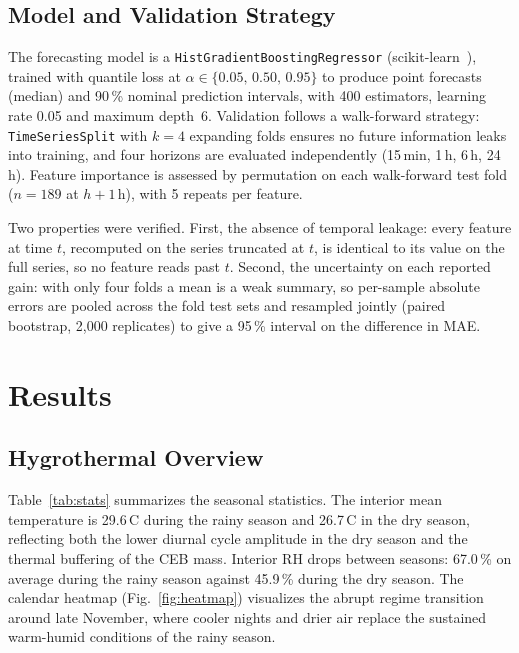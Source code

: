 \documentclass[conference]{IEEEtran}
\begin{document}
\subsection{Model and Validation Strategy}
\label{ssec:model}

The forecasting model is a \texttt{HistGradientBoosting\allowbreak Regressor}
(scikit-learn~\cite{pedregosa2011}), trained with quantile loss at
$\alpha \in \{0.05,\,0.50,\,0.95\}$ to produce point forecasts (median)
and 90\,\% nominal prediction intervals, with 400 estimators, learning
rate 0.05 and maximum depth~6. Validation follows a walk-forward
strategy: \texttt{TimeSeriesSplit} with $k=4$ expanding folds ensures
no future information leaks into training, and four horizons are
evaluated independently (15\,min, 1\,h, 6\,h, 24\,h). Feature
importance is assessed by permutation on each walk-forward test fold
($n=189$ at $h{+}1$\,h), with 5 repeats per feature.

Two properties were verified. First, the absence of temporal leakage:
every feature at time $t$, recomputed on the series truncated at $t$,
is identical to its value on the full series, so no feature reads past
$t$. Second, the uncertainty on each reported gain: with only four
folds a mean is a weak summary, so per-sample absolute errors are
pooled across the fold test sets and resampled jointly (paired
bootstrap, 2,000 replicates) to give a 95\,\% interval on the
difference in MAE.

\section{Results}
\label{sec:results}

\subsection{Hygrothermal Overview}

Table~\ref{tab:stats} summarizes the seasonal statistics. The interior
mean temperature is 29.6\,\textdegree{}C during the rainy season and
26.7\,\textdegree{}C in the dry season, reflecting both the lower diurnal
cycle amplitude in the dry season and the thermal buffering of
the CEB mass. Interior RH drops between seasons: 67.0\,\% on
average during the rainy season against 45.9\,\% during the dry season.
The calendar heatmap (Fig.~\ref{fig:heatmap}) visualizes the abrupt regime
transition around late November, where cooler nights and drier air
replace the sustained warm-humid conditions of the rainy season.
\end{document}
